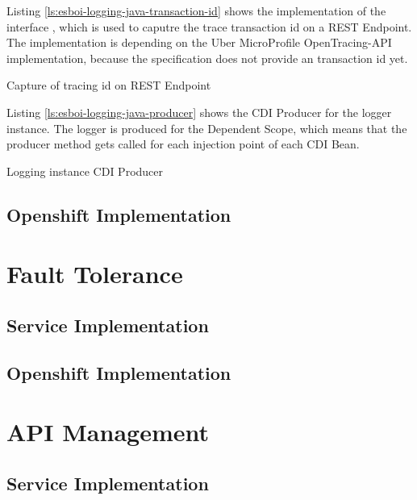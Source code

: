 Listing \vref{ls:esboi-logging-java-transaction-id} shows the implementation of the interface , which is used to caputre the trace transaction id on a REST Endpoint. The implementation is depending on the Uber MicroProfile OpenTracing-API implementation, because the specification does not provide an transaction id yet.

\begin{listing}
	\caption{Capture of tracing id on REST Endpoint}
	\label{ls:esboi-logging-java-transaction-id}
\end{listing} 

Listing \vref{ls:esboi-logging-java-producer} shows the CDI Producer for the logger instance. The logger is produced for the Dependent Scope, which means that the producer method gets called for each injection point of each CDI Bean.

\begin{listing}
	\caption{Logging instance CDI Producer}
	\label{ls:esboi-logging-java-producer}
\end{listing} 


\subsection{Openshift Implementation}
\label{sec:esbi-logging-openshift}

\section{Fault Tolerance}
\label{sec:esbi-fault}

\subsection{Service Implementation}
\label{sec:esbi-fault-service}

\subsection{Openshift Implementation}
\label{sec:esbi-fault-openshift}

\section{API Management}
\label{sec:esbi-api}

\subsection{Service Implementation}
\label{sec:esbi-api-service}

